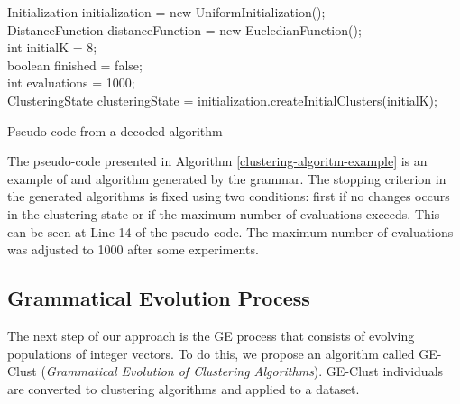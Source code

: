\documentclass[conference]{IEEEtran}
\begin{document}
	
	\begin{algorithm}[!htb]
		\label{clustering-algoritm-example}
		Initialization initialization = new UniformInitialization(); \\
		DistanceFunction distanceFunction = new EucledianFunction(); \\
		int initialK = 8; \\
		boolean finished = false; \\
		int evaluations = 1000;\\
		ClusteringState 
		clusteringState = initialization.createInitialClusters(initialK); \\
		\caption{Pseudo code from a decoded algorithm}
	\end{algorithm}
	
	
	The pseudo-code presented in Algorithm \ref{clustering-algoritm-example} is an example of and algorithm generated by the grammar. The stopping criterion in the generated algorithms is fixed using two conditions: first if no changes occurs in the clustering state or if the maximum number of evaluations exceeds. This can be seen at Line 14 of the pseudo-code. The maximum number of evaluations was adjusted to 1000 after some experiments.
	
	
	\subsection{Grammatical Evolution Process}
	
	
	The next step of our approach is the GE process that consists of evolving populations of integer vectors. To do this, we propose an algorithm called GE-Clust ({\it Grammatical Evolution of Clustering Algorithms}). GE-Clust individuals are converted to clustering algorithms and applied to a dataset.
	
\end{document}
